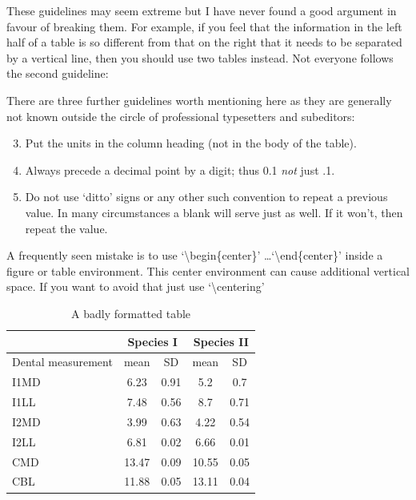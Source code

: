 \documentclass[a4paper,12pt,times,print,index, custombib]{PhDThesisPSnPDF}\usepackage[]{graphicx}\usepackage[]{color}
\begin{document}
These guidelines may seem extreme but I have
never found a good argument in favour of breaking them. For
example, if you feel that the information in the left half of
a table is so different from that on the right that it needs
to be separated by a vertical line, then you should use two
tables instead. Not everyone follows the second guideline:

There are three further guidelines worth mentioning here as they
are generally not known outside the circle of professional
typesetters and subeditors:

\begin{enumerate}\setcounter{enumi}{2}
  \item Put the units in the column heading (not in the body of
          the table).
  \item Always precede a decimal point by a digit; thus 0.1
      {\em not} just .1.
  \item Do not use `ditto' signs or any other such convention to
      repeat a previous value. In many circumstances a blank
      will serve just as well. If it won't, then repeat the value.
\end{enumerate}

A frequently seen mistake is to use `\textbackslash begin\{center\}' \dots `\textbackslash end\{center\}' inside a figure or table environment. This center environment can cause additional vertical space. If you want to avoid that just use `\textbackslash centering'


\begin{table}
\caption{A badly formatted table}
\centering
\label{table:bad_table}
\begin{tabular}{|l|c|c|c|c|}
\hline 
& \multicolumn{2}{c}{Species I} & \multicolumn{2}{c|}{Species II} \\ 
\hline
Dental measurement  & mean & SD  & mean & SD  \\ \hline 
\hline
I1MD & 6.23 & 0.91 & 5.2  & 0.7  \\
\hline 
I1LL & 7.48 & 0.56 & 8.7  & 0.71 \\
\hline 
I2MD & 3.99 & 0.63 & 4.22 & 0.54 \\
\hline 
I2LL & 6.81 & 0.02 & 6.66 & 0.01 \\
\hline 
CMD & 13.47 & 0.09 & 10.55 & 0.05 \\
\hline 
CBL & 11.88 & 0.05 & 13.11 & 0.04\\ 
\hline 
\end{tabular}
\end{table}
\end{document}
